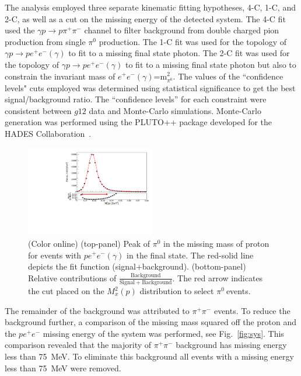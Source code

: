 \documentclass[aps,prc,twocolumn,floatfix,showpacs,preprintnumbers,amsmath,amssymb,superscriptaddress,linenumbers]{revtex4-1}
\def\pizT{$\pi^{0} \ $}
\begin{document}
The analysis employed three separate kinematic fitting 
hypotheses, 4-C, 1-C, and 2-C, as well as a cut on the missing 
energy of the detected system. The 4-C fit used the $\gamma 
p\rightarrow p\pi^+\pi^-$ channel to filter background from double 
charged pion production from single $\pi^0$ production. The 1-C fit
was used for the topology of $\gamma p\rightarrow pe^+e^-(\gamma)$ 
to fit to a missing final state photon.  The 2-C fit was used for 
the topology of $\gamma p\rightarrow pe^+e^-(\gamma)$ to fit to a 
missing final state photon but also to constrain the invariant 
mass of $e^+e^-(\gamma)$=m$^2_{\pi^0}$. The values of 
the ``confidence levels" cuts employed was determined using 
statistical significance to get the best signal/background ratio.
 The ``confidence levels'' for each constraint were consistent 
between $g12$ data and Monte-Carlo simulations. 
Monte-Carlo generation was performed using the PLUTO++ package 
developed for the HADES Collaboration~\cite{PLUTO}.
\begin{figure}[htb!]
\centerline{
        \includegraphics[height=0.35\textwidth,width=0.5\textwidth]{G12_Pi0_wBck.pdf}}

        \caption {(Color online) (top-panel) Peak of $\pi^0$ in the missing
        mass of proton for events with $pe^+e^-(\gamma)$ in the final state.
        The red-solid line depicts the fit function (signal+background).
        (bottom-panel) Relative contributions of $\frac{\mathrm{Background}}
        {\mathrm{Signal + Background}}$. The red arrow indicates the cut
        placed on the $M_x^2(p)$ distribution to select \pizT events.}
        \label{fig:pi0_peak}
\end{figure}

The remainder of the background was attributed to $\pi^+\pi^-$
events. To reduce the background further, a comparison of the 
missing mass squared off the proton and the $pe^+e^-$ missing 
energy of the system was performed, see Fig.~\ref{fig:sys}. This 
comparison revealed that the majority of $\pi^+\pi^-$ background 
has missing energy less than 75~MeV. To eliminate this background 
all events with a missing energy less than 75~MeV were removed.
\end{document}

